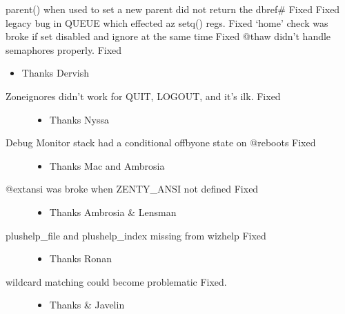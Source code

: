 \documentclass[letterpaper,10pt,english]{sphinxmanual}
\begin{document}
\sphinxAtStartPar
parent() when used to set a new parent did not return the dbref\# \sphinxhyphen{} Fixed
Fixed legacy bug in QUEUE which effected a\sphinxhyphen{}z setq() regs. \sphinxhyphen{} Fixed
‘home’ check was broke if set disabled and ignore at the same time \sphinxhyphen{} Fixed
@thaw didn’t handle semaphores properly. \sphinxhyphen{} Fixed
\begin{itemize}
\item {} 
\sphinxAtStartPar
Thanks Dervish

\end{itemize}
\begin{description}
\item[{Zone\sphinxhyphen{}ignores didn’t work for QUIT, LOGOUT, and it’s ilk. \sphinxhyphen{} Fixed}] \leavevmode\begin{itemize}
\item {} 
\sphinxAtStartPar
Thanks Nyssa

\end{itemize}

\item[{Debug Monitor stack had a conditional off\sphinxhyphen{}by\sphinxhyphen{}one state on @reboots \sphinxhyphen{} Fixed}] \leavevmode\begin{itemize}
\item {} 
\sphinxAtStartPar
Thanks Mac and Ambrosia

\end{itemize}

\item[{@extansi was broke when ZENTY\_ANSI not defined \sphinxhyphen{} Fixed}] \leavevmode\begin{itemize}
\item {} 
\sphinxAtStartPar
Thanks Ambrosia \& Lensman

\end{itemize}

\item[{plushelp\_file and plushelp\_index missing from wizhelp \sphinxhyphen{} Fixed}] \leavevmode\begin{itemize}
\item {} 
\sphinxAtStartPar
Thanks Ronan

\end{itemize}

\item[{wildcard matching could become problematic \sphinxhyphen{} Fixed.}] \leavevmode\begin{itemize}
\item {} 
\sphinxAtStartPar
Thanks  \& Javelin

\end{itemize}

\end{description}
\end{document}
